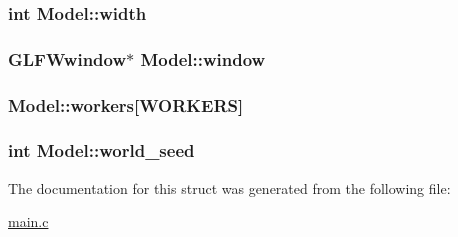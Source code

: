 \subsubsection[{\texorpdfstring{width}{width}}]{\setlength{\rightskip}{0pt plus 5cm}int Model\+::width}\hypertarget{structModel_a95fedd30937f05f07f81b7fa3aa29add}{}\label{structModel_a95fedd30937f05f07f81b7fa3aa29add}
\subsubsection[{\texorpdfstring{window}{window}}]{\setlength{\rightskip}{0pt plus 5cm}G\+L\+F\+Wwindow$\ast$ Model\+::window}\hypertarget{structModel_af15f84653ef65888f996e6b78c1d6ff7}{}\label{structModel_af15f84653ef65888f996e6b78c1d6ff7}
\subsubsection[{\texorpdfstring{workers}{workers}}]{ Model\+::workers\mbox{[}{\bf W\+O\+R\+K\+E\+RS}\mbox{]}}\hypertarget{structModel_af82468267fcf9f7720dd378e0a46bad7}{}\label{structModel_af82468267fcf9f7720dd378e0a46bad7}
\subsubsection[{\texorpdfstring{world\+\_\+seed}{world_seed}}]{\setlength{\rightskip}{0pt plus 5cm}int Model\+::world\+\_\+seed}\hypertarget{structModel_a61caead581f113d0c540e578c323ab34}{}\label{structModel_a61caead581f113d0c540e578c323ab34}


The documentation for this struct was generated from the following file\+:\begin{DoxyCompactItemize}
\item 
\hyperlink{main_8c}{main.\+c}\end{DoxyCompactItemize}
